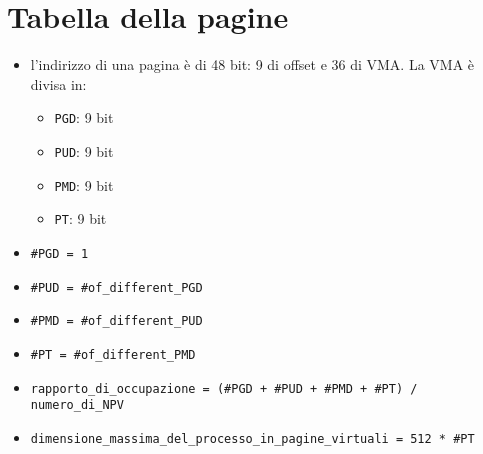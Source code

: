 \documentclass[12pt, a4paper]{report}
\begin{document}

\newpage
\section*{Tabella della pagine}
\begin{itemize}
	\item l'indirizzo di una pagina è di 48 bit: 9 di offset e 36 di VMA. La
	      VMA è divisa in:
	      \begin{itemize}
		      \item \texttt{PGD}: 9 bit
		      \item \texttt{PUD}: 9 bit
		      \item \texttt{PMD}: 9 bit
		      \item \texttt{PT}: 9 bit
	      \end{itemize}
	\item \texttt{\#PGD = 1}
	\item \texttt{\#PUD = \#of\_different\_PGD}
	\item \texttt{\#PMD = \#of\_different\_PUD}
	\item \texttt{\#PT = \#of\_different\_PMD}
	\item \texttt{rapporto\_di\_occupazione = (\#PGD + \#PUD + \#PMD + \#PT) /
		      numero\_di\_NPV} \item
	      \texttt{dimensione\_massima\_del\_processo\_in\_pagine\_virtuali =
		      512 * \#PT}
\end{itemize}
\end{document}

